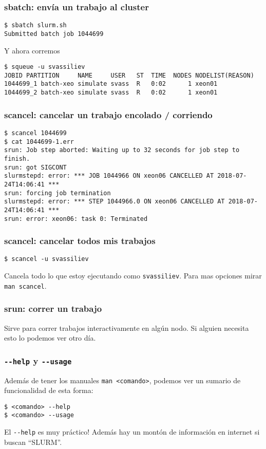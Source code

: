 \documentclass[handout]{beamer}
\begin{document}
\begin{frame}[fragile]
\frametitle{sbatch: envía un trabajo al cluster}

\begin{verbatim}
$ sbatch slurm.sh
Submitted batch job 1044699
\end{verbatim}
\pause
Y ahora corremos
\begin{verbatim}
$ squeue -u svassiliev
JOBID PARTITION     NAME     USER   ST  TIME  NODES NODELIST(REASON)
1044699_1 batch-xeo simulate svass  R   0:02      1 xeon01
1044699_2 batch-xeo simulate svass  R   0:02      1 xeon01
\end{verbatim}
\end{frame}

\begin{frame}[fragile]
\frametitle{scancel: cancelar un trabajo encolado / corriendo}

\begin{verbatim}
$ scancel 1044699 
$ cat 1044699-1.err
srun: Job step aborted: Waiting up to 32 seconds for job step to finish.
srun: got SIGCONT
slurmstepd: error: *** JOB 1044966 ON xeon06 CANCELLED AT 2018-07-24T14:06:41 ***
srun: forcing job termination
slurmstepd: error: *** STEP 1044966.0 ON xeon06 CANCELLED AT 2018-07-24T14:06:41 ***
srun: error: xeon06: task 0: Terminated
\end{verbatim}
\end{frame}

\begin{frame}[fragile]
\frametitle{scancel: cancelar todos mis trabajos}

\begin{verbatim}
$ scancel -u svassiliev
\end{verbatim}

Cancela todo lo que estoy ejecutando como \Verb=svassiliev=. Para mas opciones mirar \Verb=man scancel=.
\end{frame}

\begin{frame}[fragile]
\frametitle{srun: correr un trabajo}
Sirve para correr trabajos interactivamente en algún nodo. Si alguien necesita esto lo podemos ver otro día.
\end{frame}

\begin{frame}[fragile]
\frametitle{\Verb=--help= y \Verb=--usage=}
Además de tener los manuales \Verb=man <comando>=, podemos ver un sumario de funcionalidad de esta forma:
\begin{verbatim}
$ <comando> --help
$ <comando> --usage
\end{verbatim}

\pause

El \Verb=--help= es muy práctico! Además hay un montón de información en internet si buscan ``SLURM''.
\end{frame}
\end{document}
